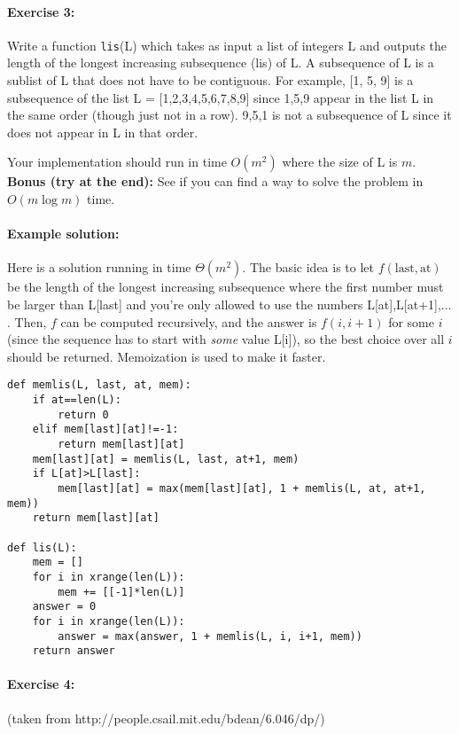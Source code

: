 \documentclass[11pt]{article}
\begin{document}
\paragraph{Exercise 3:}
Write a function \texttt{lis}(L) which takes as input a list of
integers L and outputs the length of the longest increasing
subsequence (lis) of L.  A subsequence of L is a sublist of L that
does not have to be contiguous.  For example, [1, 5, 9] is a
subsequence of the list L = [1,2,3,4,5,6,7,8,9] since 1,5,9 appear in
the list L in the same order (though just not in a row).  9,5,1 is not
a subsequence of L since it does not appear in L in that order.

Your implementation should run in time $O(m^2)$ where the size of L is
$m$.  \textbf{Bonus (try at the end):} See if you can find a way to
solve the problem in $O(m\log m)$ time.

\paragraph{Example solution:}
Here is a solution running in time $\Theta(m^2)$. The basic idea is
to let $f(\mathrm{last}, \mathrm{at})$ be the length of the longest
increasing
subsequence where the first number must be larger than L[last] and
you're only allowed to use the numbers L[at],L[at+1],$\ldots$.  Then,
$f$ can be computed recursively, and the answer is $f(i, i+1)$ for
some $i$ (since the sequence has to start with {\em some} value L[i]),
so the best choice over all $i$ should be returned.
Memoization is used to make it faster.

\begin{verbatim}
def memlis(L, last, at, mem):
    if at==len(L):
        return 0
    elif mem[last][at]!=-1:
        return mem[last][at]
    mem[last][at] = memlis(L, last, at+1, mem)
    if L[at]>L[last]:
        mem[last][at] = max(mem[last][at], 1 + memlis(L, at, at+1, mem))
    return mem[last][at]

def lis(L):
    mem = []
    for i in xrange(len(L)):
        mem += [[-1]*len(L)]
    answer = 0
    for i in xrange(len(L)):
        answer = max(answer, 1 + memlis(L, i, i+1, mem))
    return answer
\end{verbatim}

\paragraph{Exercise 4:}
(taken from http://people.csail.mit.edu/bdean/6.046/dp/)
\end{document}
